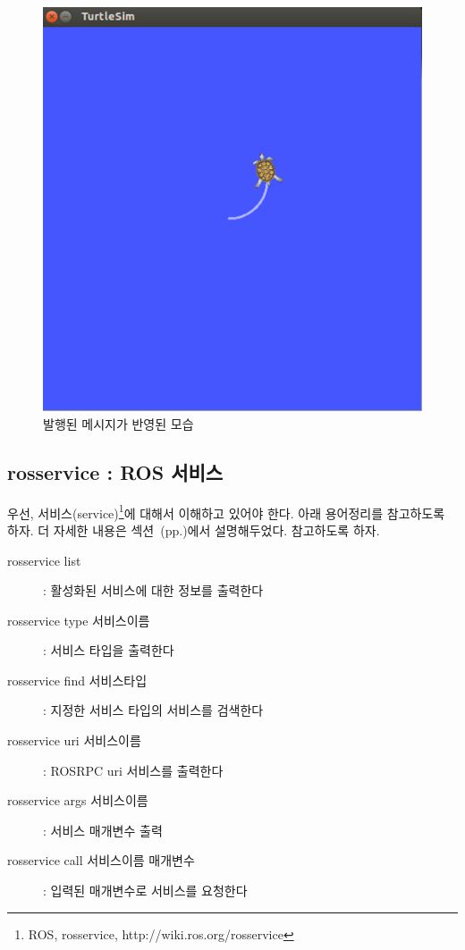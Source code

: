 \begin{figure}[h]
\centering\includegraphics[width=0.7\columnwidth]{pictures/chapter5/rostopic_pub.png}
\caption{발행된 메시지가 반영된 모습}
\end{figure}


\subsection{rosservice : ROS 서비스}

우선, 서비스(service)\footnote{ROS, rosservice, http://wiki.ros.org/rosservice}에 대해서 이해하고 있어야 한다. 아래 용어정리를 참고하도록 하자. 더 자세한 내용은 섹션~(pp.\pageref{def:RosService})에서 설명해두었다. 참고하도록 하자.

\vspace{\baselineskip}
\noindent
\begin{description}
\item[rosservice list] : 활성화된 서비스에 대한 정보를 출력한다
\item[rosservice type 서비스이름] : 서비스 타입을 출력한다
\item[rosservice find 서비스타입] : 지정한 서비스 타입의 서비스를 검색한다
\item[rosservice uri  서비스이름] : ROSRPC uri 서비스를 출력한다
\item[rosservice args 서비스이름] : 서비스 매개변수 출력
\item[rosservice call 서비스이름 매개변수] : 입력된 매개변수로 서비스를 요청한다
\end{description}

